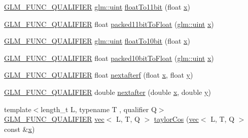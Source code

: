 \begin{DoxyCompactItemize}
\item 
\hyperlink{setup_8hpp_a33fdea6f91c5f834105f7415e2a64407}{G\+L\+M\+\_\+\+F\+U\+N\+C\+\_\+\+Q\+U\+A\+L\+I\+F\+I\+ER} \hyperlink{group__core__precision_ga4fd29415871152bfb5abd588334147c8}{glm\+::uint} \hyperlink{namespaceglm_1_1detail_a62edbdbe89fe6282dd7909e6e4703796}{float\+To11bit} (float \hyperlink{_s_d_l__opengl_8h_ad0e63d0edcdbd3d79554076bf309fd47}{x})
\item 
\hyperlink{setup_8hpp_a33fdea6f91c5f834105f7415e2a64407}{G\+L\+M\+\_\+\+F\+U\+N\+C\+\_\+\+Q\+U\+A\+L\+I\+F\+I\+ER} float \hyperlink{namespaceglm_1_1detail_a0148d59bbb6dbf6c0f296e73a527c225}{packed11bit\+To\+Float} (\hyperlink{group__core__precision_ga4fd29415871152bfb5abd588334147c8}{glm\+::uint} \hyperlink{_s_d_l__opengl_8h_ad0e63d0edcdbd3d79554076bf309fd47}{x})
\item 
\hyperlink{setup_8hpp_a33fdea6f91c5f834105f7415e2a64407}{G\+L\+M\+\_\+\+F\+U\+N\+C\+\_\+\+Q\+U\+A\+L\+I\+F\+I\+ER} \hyperlink{group__core__precision_ga4fd29415871152bfb5abd588334147c8}{glm\+::uint} \hyperlink{namespaceglm_1_1detail_a2be3138712a0811602a183614221ad5c}{float\+To10bit} (float \hyperlink{_s_d_l__opengl_8h_ad0e63d0edcdbd3d79554076bf309fd47}{x})
\item 
\hyperlink{setup_8hpp_a33fdea6f91c5f834105f7415e2a64407}{G\+L\+M\+\_\+\+F\+U\+N\+C\+\_\+\+Q\+U\+A\+L\+I\+F\+I\+ER} float \hyperlink{namespaceglm_1_1detail_afddea7fa02b61b01129777a21380edf4}{packed10bit\+To\+Float} (\hyperlink{group__core__precision_ga4fd29415871152bfb5abd588334147c8}{glm\+::uint} \hyperlink{_s_d_l__opengl_8h_ad0e63d0edcdbd3d79554076bf309fd47}{x})
\item 
\hyperlink{setup_8hpp_a33fdea6f91c5f834105f7415e2a64407}{G\+L\+M\+\_\+\+F\+U\+N\+C\+\_\+\+Q\+U\+A\+L\+I\+F\+I\+ER} float \hyperlink{namespaceglm_1_1detail_ab0eb795c482130b1d6c83470bdb031e6}{nextafterf} (float \hyperlink{_s_d_l__opengl_8h_ad0e63d0edcdbd3d79554076bf309fd47}{x}, float \hyperlink{_s_d_l__opengl_8h_a1675d9d7bb68e1657ff028643b4037e3}{y})
\item 
\hyperlink{setup_8hpp_a33fdea6f91c5f834105f7415e2a64407}{G\+L\+M\+\_\+\+F\+U\+N\+C\+\_\+\+Q\+U\+A\+L\+I\+F\+I\+ER} double \hyperlink{namespaceglm_1_1detail_a3c14f8400407e8b4cff5be12ceef2c1e}{nextafter} (double \hyperlink{_s_d_l__opengl_8h_ad0e63d0edcdbd3d79554076bf309fd47}{x}, double \hyperlink{_s_d_l__opengl_8h_a1675d9d7bb68e1657ff028643b4037e3}{y})
\item 
{\footnotesize template$<$length\+\_\+t L, typename T , qualifier Q$>$ }\\\hyperlink{setup_8hpp_a33fdea6f91c5f834105f7415e2a64407}{G\+L\+M\+\_\+\+F\+U\+N\+C\+\_\+\+Q\+U\+A\+L\+I\+F\+I\+ER} \hyperlink{structglm_1_1vec}{vec}$<$ L, T, Q $>$ \hyperlink{namespaceglm_1_1detail_a2cb8ceabe04661b078d956cf0a5e96c7}{taylor\+Cos} (\hyperlink{structglm_1_1vec}{vec}$<$ L, T, Q $>$ const \&\hyperlink{_s_d_l__opengl_8h_ad0e63d0edcdbd3d79554076bf309fd47}{x})

\end{DoxyCompactItemize}
